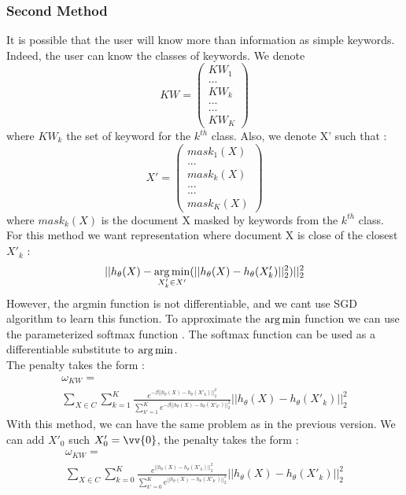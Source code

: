 \subsubsection{Second Method}
It is possible that the user will know more than
information as simple keywords. Indeed, the user can know the 
classes of keywords.
We denote 
\begin{equation}
KW = \begin{pmatrix}KW_1  \\ ... \\ KW_k \\ ...\\ ... \\ KW_{K}\end{pmatrix}
\end{equation}
where $KW_k$ the set of keyword for the $k^{th}$ class. Also, we denote X' such that :
\begin{equation}
X' = \begin{pmatrix}mask_1(X)  \\ ... \\ mask_k(X) \\ ...\\ ... \\ mask_K(X)\end{pmatrix}
\end{equation}
where $mask_k(X)$ is the document X  masked by keywords from the $k^{th}$ class. 
For this method we want representation where document X is close of the closest
$X'_k$ : 
\begin{equation}
|| h_\theta(X) - \operatorname*{arg\,min}\limits_{X'_k \in X'}(|| h_\theta(X) - 
h_\theta(X'_k)||_2^2)  ||_2^2
\end{equation}
However, the argmin function is not differentiable, and we cant use SGD algorithm
to learn this function. To approximate the $\operatorname*{arg\,min}$ function we can use the 
parameterized softmax function \cite{doi:10.1117/1.2819119}. The softmax 
function can be used as a differentiable substitute to $\operatorname*{arg\,min}$. 
\\The penalty takes the form : 
\begin{equation}\label{eq:omega_kw_soft}
\begin{array}{l}
  \omega_{KW} = \\ \sum\limits_{X \in C} \sum\limits_{k = 1}^K \frac{e^{-\beta|| h_\theta(X) - 
h_\theta(X'_k)||_2^2}}{\sum\limits_{k' = 1}^K e^{-\beta|| h_\theta(X) - 
h_\theta(X'_{k'})||_2^2}}|| h_\theta(X) - h_\theta(X'_{k})||_2^2
\end{array}
\end{equation}
With this method, we can have the same problem as in the previous version.
We can add $X'_0$ such $X'_0 = \vv{0}$, the penalty takes the form :
\begin{equation}\label{eq:k_add}
\begin{array}{l}
  \omega_{KW} = \\ \sum\limits_{X \in C} \sum\limits_{k = 0}^K \frac{e^{|| h_\theta(X) - 
h_\theta(X'_k)||_2^2}}{\sum\limits_{k' = 0}^K e^{|| h_\theta(X) - 
h_\theta(X'_{k'})||_2^2}}|| h_\theta(X) - h_\theta(X'_{k})||_2^2
\end{array}
\end{equation} 
